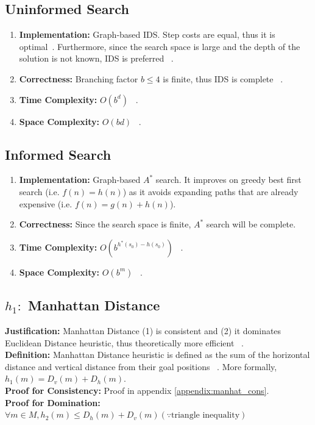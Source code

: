 \documentclass[runningheads]{llncs}
\begin{document}
\subsection{Uninformed Search}
\begin{enumerate}
    \item \textbf{Implementation:} Graph-based IDS. Step costs are equal, thus it is optimal~\cite[p88]{stuart_russell_artifical_2010}. Furthermore, since the search space is large and the depth of the solution is not known, IDS is preferred ~\cite[p90]{stuart_russell_artifical_2010}.
    \item \textbf{Correctness:} Branching factor \( b \leq 4 \) is finite, thus IDS is complete ~\cite[p88-90]{stuart_russell_artifical_2010}. 
    \item \textbf{Time Complexity:} \( O(b^d) \) ~\cite[p88-90]{stuart_russell_artifical_2010}.
    \item \textbf{Space Complexity:} \( O(bd) \) ~\cite[p88-90]{stuart_russell_artifical_2010}.
\end{enumerate}

\subsection{Informed Search}
\begin{enumerate}
    \item \textbf{Implementation:} Graph-based \( A^* \) search. It improves on greedy best first search (i.e. \( f(n) = h(n) \)) as it avoids expanding paths that are already expensive (i.e. \( f(n) = g(n) + h(n) \)).
    \item \textbf{Correctness:} Since the search space is finite, \( A^* \) search will be complete.
    \item \textbf{Time Complexity:} \( O(b^{h^*(s_0) - h(s_0)}) \) ~\cite[p93-99]{stuart_russell_artifical_2010}.
    \item \textbf{Space Complexity:} \( O(b^m) \) ~\cite[p93-99]{stuart_russell_artifical_2010}.
\end{enumerate}

\subsection{\(h_1:\) Manhattan Distance} 
\textbf{Justification:} Manhattan Distance (1) is consistent and (2) it dominates Euclidean Distance heuristic, thus theoretically more efficient ~\cite[104]{stuart_russell_artifical_2010}. \\
\textbf{Definition:} Manhattan Distance heuristic is defined as the sum of the horizontal distance and vertical distance from their goal positions ~\cite[p103]{stuart_russell_artifical_2010}. More formally, \( h_1(m) = D_v(m) + D_h(m) \). \\
\textbf{Proof for Consistency:} Proof in appendix \ref{appendix:manhat_cons}. \\
\textbf{Proof for Domination:} \( \forall m \in M, h_{2}(m) \leq D_h(m) + D_v(m) (\because \text{triangle inequality}) \)
\end{document}
